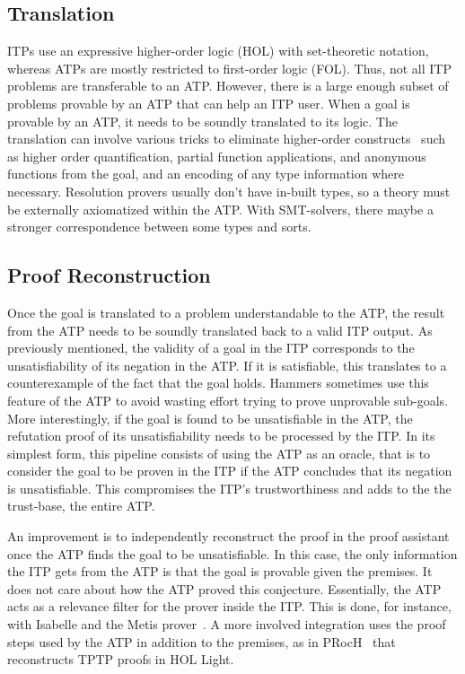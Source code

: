 \documentclass{article}
\begin{document}
		\subsection{Translation}
		ITPs use an expressive higher-order logic
		(HOL) with set-theoretic notation, whereas ATPs 
		are mostly restricted to first-order logic (FOL). 
		Thus, not all ITP problems are transferable to 
		an ATP. However, there is a large enough subset 
		of problems provable by an ATP that can help an 
		ITP user. When a goal is provable by an ATP, it 
		needs to be soundly translated to its logic. 
		The translation can involve various tricks to 
		eliminate higher-order 
		constructs~\cite{DBLP:journals/jar/MengP08} 
		such as higher order quantification, partial 
		function applications, and anonymous functions
		from the goal, and an encoding of any 
		type information where necessary. Resolution 
		provers usually don't have in-built types, so a 
		theory must be externally axiomatized within the 
		ATP. With SMT-solvers, there maybe a stronger
		correspondence between some types and 
		sorts.
	
		\subsection{Proof Reconstruction}
		Once the goal is translated to a problem understandable 
		to the ATP, the result from the ATP needs to be 
		soundly translated back to a valid ITP output.
		As previously mentioned, the validity of a goal in 
		the ITP corresponds to the unsatisfiability of its 
		negation in the ATP. If it is satisfiable, this 
		translates to a counterexample of the fact that 
		the goal holds. Hammers sometimes use this 
		feature of the ATP to avoid wasting effort 
		trying to prove unprovable sub-goals. More 
		interestingly, if the goal is found to be 
		unsatisfiable in the ATP, the refutation proof of 
		its unsatisfiability needs to be processed by the 
		ITP. In its simplest form, this pipeline consists 
		of using the ATP as an oracle, that is to consider 
		the goal to be proven in the ITP if the ATP 
		concludes that its negation is unsatisfiable. 
		This compromises the ITP's trustworthiness and adds 
		to the the trust-base, the entire ATP.
		
		An improvement is to independently reconstruct 
		the proof in the proof assistant once the ATP finds 
		the goal to be unsatisfiable. In this case, the 
		only information the ITP gets from the ATP is that 
		the goal is provable given the premises. It does 
		not care about how the ATP proved this conjecture.
		Essentially, the ATP acts as a relevance filter for 
		the prover inside the ITP. This is done, for instance, 
		with Isabelle and the Metis 
		prover~\cite{10.1007/978-3-540-74591-4_18}. A more
		involved integration uses the proof steps used by 
		the ATP in addition to the premises, as in 
		PRocH~\cite{10.1007/978-3-642-38574-2_18} that reconstructs TPTP proofs in HOL Light.
		
\end{document}
